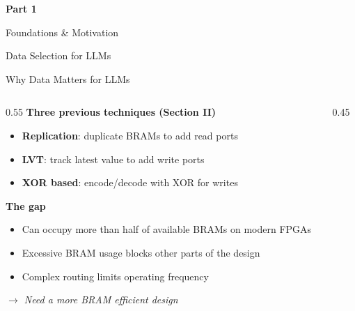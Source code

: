 \documentclass[aspectratio=169]{beamer}
\begin{document}
\begin{frame}

\begin{center}

\vspace{2cm}

{\color{ucrblue}\Huge\textbf{Part 1}}

\vspace{0.8cm}

{\LARGE Foundations \& Motivation}

\vspace{1cm}

{\large Data Selection for LLMs}

\end{center}

\end{frame}
\begin{frame}{Why Data Matters for LLMs}
  \begin{columns}[T]
    \begin{column}{0.55\textwidth}
      \textbf{Three previous techniques (Section II)}
      \begin{itemize}
        \item \textbf{Replication}: duplicate BRAMs to add read ports
        \item \textbf{LVT}: track latest value to add write ports
        \item \textbf{XOR based}: encode/decode with XOR for writes
      \end{itemize}

      \vspace{0.5em}
      \textbf{The gap}
      \begin{itemize}
        \item Can occupy more than half of available BRAMs on modern FPGAs
        \item Excessive BRAM usage blocks other parts of the design
        \item Complex routing limits operating frequency
      \end{itemize}

      \vspace{0.3em}
      \textit{$\rightarrow$ Need a more BRAM efficient design}
    \end{column}
    \begin{column}{0.45\textwidth}
      \centering
    \end{column}
  \end{columns}
\end{frame}
\end{document}
